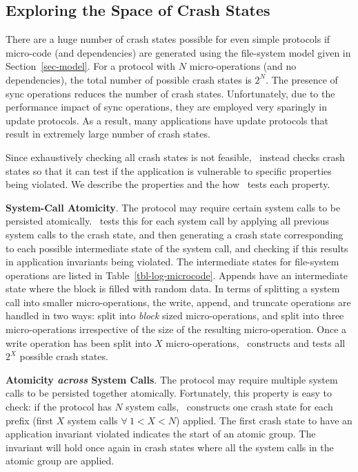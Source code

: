\subsection{Exploring the Space of Crash States}
\label{sec-explore}

There are a huge number of crash states possible for even simple protocols if
micro-code (and dependencies) are generated using the file-system model given
in Section~\ref{sec-model}. For a protocol with $N$ micro-operations (and no
dependencies), the total number of possible crash states is $2^{N}$. The
presence of sync operations reduces the number of crash states. Unfortunately,
due to the performance impact of sync operations, they are employed very
sparingly in update protocols. As a result, many applications have update
protocols that result in extremely large number of crash states.

Since exhaustively checking all crash states is not feasible, \toolname\
instead checks crash states so that it can test if the application is
vulnerable to specific properties being violated. We describe the properties
and the how \toolname\ tests each property.

\textbf{System-Call Atomicity}. The protocol may require certain system calls
to be persisted atomically. \toolname\ tests this for each system call by
applying all previous system calls to the crash state, and then generating a
crash state corresponding to each possible intermediate state of the system
call, and checking if this results in application invariants being violated.
The intermediate states for file-system operations are listed in
Table~\ref{tbl-log-microcode}. Appends have an intermediate state where the
block is filled with random data. In terms of splitting a system call into
smaller micro-operations, the write, append, and truncate operations are
handled in two ways: split into \textit{block} sized micro-operations, and
split into three micro-operations irrespective of the size of the resulting
micro-operation.  Once a write operation has been split into $X$
micro-operations, \toolname\ constructs and tests all $2^{X}$ possible crash
states. 

\textbf{Atomicity \textit{across} System Calls}. The protocol may require
multiple system calls to be persisted together atomically.  Fortunately, this
property is easy to check: if the protocol has $N$ system calls, \toolname\
constructs one crash state for each prefix (first $X$ system calls $\forall\ 1
< X < N$) applied. The first crash state to have an application invariant
violated indicates the start of an atomic group. The invariant will hold once
again in crash states where all the system calls in the atomic group are
applied.  

